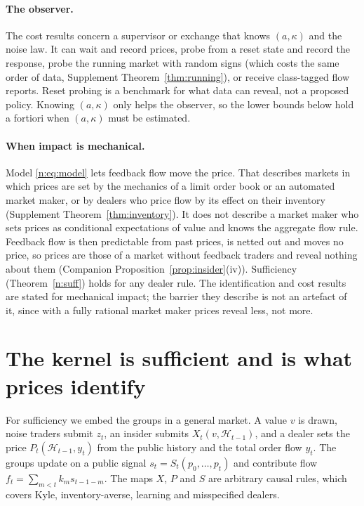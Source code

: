 \documentclass[12pt]{article}
\theoremstyle{definition}
\theoremstyle{remark}
\begin{document}
\paragraph{The observer.} The cost results concern a supervisor or exchange that knows $(a,\kappa)$ and the noise law. It can wait and record prices, probe from a reset state and record the response, probe the running market with random signs (which costs the same order of data, Supplement Theorem~\ref{thm:running}), or receive class-tagged flow reports. Reset probing is a benchmark for what data can reveal, not a proposed policy. Knowing $(a,\kappa)$ only helps the observer, so the lower bounds below hold a fortiori when $(a,\kappa)$ must be estimated.

\paragraph{When impact is mechanical.} Model \eqref{n:eq:model} lets feedback flow move the price. That describes markets in which prices are set by the mechanics of a limit order book or an automated market maker, or by dealers who price flow by its effect on their inventory (Supplement Theorem~\ref{thm:inventory}). It does not describe a market maker who sets prices as conditional expectations of value and knows the aggregate flow rule. Feedback flow is then predictable from past prices, is netted out and moves no price, so prices are those of a market without feedback traders and reveal nothing about them (Companion Proposition~\ref{prop:insider}(iv)). Sufficiency (Theorem~\ref{n:suff}) holds for any dealer rule. The identification and cost results are stated for mechanical impact; the barrier they describe is not an artefact of it, since with a fully rational market maker prices reveal less, not more.

\section{The kernel is sufficient and is what prices identify}\label{n:suff_sec}

For sufficiency we embed the groups in a general market. A value $v$ is drawn, noise traders submit $z_t$, an insider submits $X_t(v,\mathcal H_{t-1})$, and a dealer sets the price $P_t(\mathcal H_{t-1},y_t)$ from the public history and the total order flow $y_t$. The groups update on a public signal $s_t=S_t(p_0,\ldots,p_t)$ and contribute flow $f_t=\sum_{m<t}k_ms_{t-1-m}$. The maps $X$, $P$ and $S$ are arbitrary causal rules, which covers Kyle, inventory-averse, learning and misspecified dealers.
\end{document}
